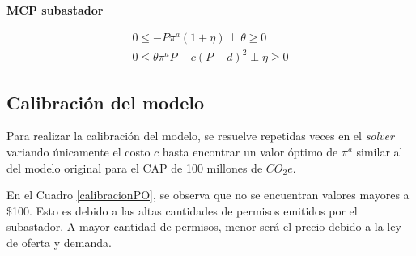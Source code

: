 \textbf{MCP subastador}

\begin{footnotesize}
\begin{align}
0\leq -P\pi^a(1+\eta) \perp \theta \geq 0 \label{compllag33}\\
0 \leq \theta \pi^a P - c(P-d)^2 \perp \eta \geq 0 \label{compllag331}
\end{align}
\end{footnotesize}

\subsection{Calibración del modelo}

Para realizar la calibración del modelo, se resuelve repetidas veces en el \textit{solver} variando únicamente el costo $c$ hasta encontrar un valor óptimo de $\pi^a $ similar al del modelo original para el CAP de 100 millones de $CO_{2}e$.     
\vspace{2.5mm}

En el Cuadro \ref{calibracionPO}, se observa que no se encuentran valores mayores a \$100. Esto es debido a las altas cantidades de permisos emitidos por el subastador. A mayor cantidad de permisos, menor será el precio debido a la ley de oferta y demanda.
\vspace{2.5mm}

